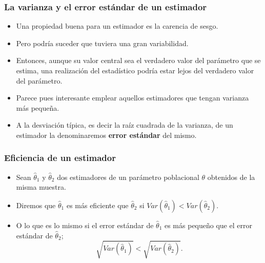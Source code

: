 \begin{frame}
\frametitle{La varianza y el  error estándar de un estimador}

\begin{itemize}
    \item Una propiedad buena para un estimador es
    la  carencia de sesgo.
\item  Pero podría suceder que tuviera una gran
    variabilidad.
\item  Entonces, aunque su valor central sea el verdadero valor del parámetro
    que se estima, una realización del  estadístico  podría estar lejos del
    verdadero valor del parámetro.
\item  Parece pues interesante emplear aquellos estimadores
    que tengan varianza más pequeña.
\item A la desviación típica, es decir la raíz cuadrada de la varianza, de un estimador la denominaremos \textbf{error estándar}
del mismo.
\end{itemize}
\end{frame}

\begin{frame}
\frametitle{Eficiencia de un  estimador}

\begin{itemize}
\item Sean $\hat{\theta}_{1}$ y $\hat{\theta}_{2}$ dos estimadores de un parámetro poblacional
$\theta$ obtenidos de la misma muestra.
\item  Diremos que $\hat{\theta}_{1}$ es más eficiente que $\hat{\theta}_{2}$
    si $Var(\hat{\theta}_{1})< Var(\hat{\theta}_{2})$.
\item O lo que es lo mismo si el error estándar de   $\hat{\theta}_{1}$ es más pequeño que el error estándar de $\hat{\theta}_{2}$; $$\sqrt{Var(\hat{\theta}_{1})}< \sqrt{Var(\hat{\theta}_{2})}.$$
\end{itemize}

% 
% 
\end{frame}


